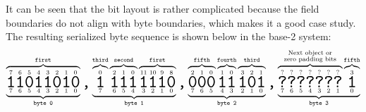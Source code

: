 \begin{remark}
    It can be seen that the bit layout is rather complicated because the field boundaries do not align with byte
    boundaries, which makes it a good case study.
    The resulting serialized byte sequence is shown below in the base-2 system:
    $$
        \underbrace{%
            \overbrace{%
                \underset{7}{\overset{7}{\hugett{1}}}%
                \underset{6}{\overset{6}{\hugett{1}}}%
                \underset{5}{\overset{5}{\hugett{0}}}%
                \underset{4}{\overset{4}{\hugett{1}}}%
                \underset{3}{\overset{3}{\hugett{1}}}%
                \underset{2}{\overset{2}{\hugett{0}}}%
                \underset{1}{\overset{1}{\hugett{1}}}%
                \underset{0}{\overset{0}{\hugett{0}}}%
            }^{\texttt{first}}%
        }_{\texttt{byte 0}}%
        \hugett{,}%
        \underbrace{%
            \overbrace{%
                \underset{7}{\overset{0}{\hugett{1}}}%
            }^{\texttt{third}}%
            \overbrace{%
                \underset{6}{\overset{2}{\hugett{1}}}%
                \underset{5}{\overset{1}{\hugett{1}}}%
                \underset{4}{\overset{0}{\hugett{1}}}%
            }^{\texttt{second}}%
            \overbrace{%
                \underset{3}{\overset{11}{\hugett{1}}}%
                \underset{2}{\overset{10}{\hugett{1}}}%
                \underset{1}{\overset{9}{\hugett{1}}}%
                \underset{0}{\overset{8}{\hugett{0}}}%
            }^{\texttt{first}}%
        }_{\texttt{byte 1}}%
        \hugett{,}%
        \underbrace{%
            \overbrace{%
                \underset{7}{\overset{2}{\hugett{0}}}%
                \underset{6}{\overset{1}{\hugett{0}}}%
                \underset{5}{\overset{0}{\hugett{0}}}%
            }^{\texttt{fifth}}%
            \overbrace{%
                \underset{4}{\overset{1}{\hugett{1}}}%
                \underset{3}{\overset{0}{\hugett{1}}}%
            }^{\texttt{fourth}}%
            \overbrace{%
                \underset{2}{\overset{3}{\hugett{1}}}%
                \underset{1}{\overset{2}{\hugett{0}}}%
                \underset{0}{\overset{1}{\hugett{1}}}%
            }^{\texttt{third}}%
        }_{\texttt{byte 2}}%
        \hugett{,}%
        \underbrace{%
            \overbrace{%
                \underset{7}{\overset{?}{\hugett{?}}}%
                \underset{6}{\overset{?}{\hugett{?}}}%
                \underset{5}{\overset{?}{\hugett{?}}}%
                \underset{4}{\overset{?}{\hugett{?}}}%
                \underset{3}{\overset{?}{\hugett{?}}}%
                \underset{2}{\overset{?}{\hugett{?}}}%
                \underset{1}{\overset{?}{\hugett{?}}}%
            }^{\substack{\text{Next object or} \\ \text{zero padding bits}}}
            \overbrace{%
                \underset{0}{\overset{3}{\hugett{1}}}%
            }^{\texttt{fifth}}%
        }_{\texttt{byte 3}}%
    $$


\end{remark}
